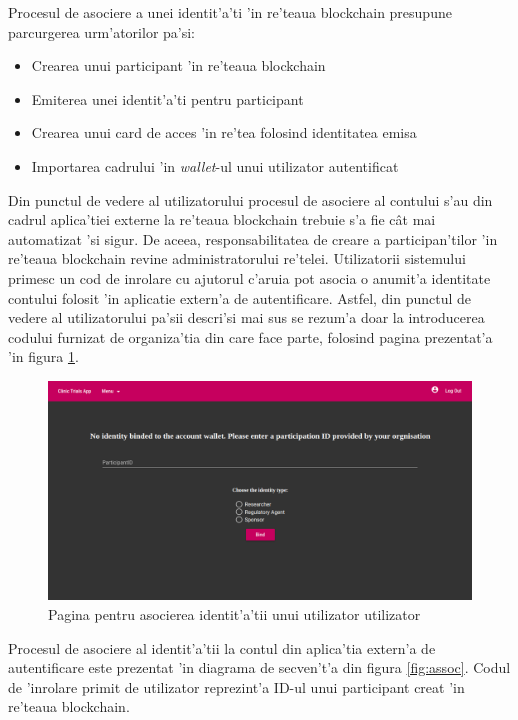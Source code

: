 \documentclass[12pt,a4paper,twoside]{report}
\begin{document}
    Procesul de asociere a unei identit'a'ti 'in re'teaua blockchain presupune parcurgerea urm'atorilor pa'si:
    \begin{itemize}
        \item Crearea unui participant 'in re'teaua blockchain
        \item Emiterea unei identit'a'ti pentru participant
        \item Crearea unui card de acces 'in re'tea folosind identitatea emisa
        \item Importarea cadrului 'in \emph{wallet}-ul unui utilizator autentificat
    \end{itemize}
    
    Din punctul de vedere al utilizatorului procesul de asociere al contului s'au din cadrul aplica'tiei externe la re'teaua blockchain trebuie s'a fie c\^at mai automatizat 'si sigur. De aceea, responsabilitatea de creare a participan'tilor 'in re'teaua blockchain revine administratorului re'telei. Utilizatorii sistemului primesc un cod de inrolare cu ajutorul c'aruia pot asocia o anumit'a identitate contului folosit 'in aplicatie extern'a de autentificare. Astfel, din punctul de vedere al utilizatorului pa'sii descri'si mai sus se rezum'a doar la introducerea codului furnizat de organiza'tia din care face parte, folosind pagina prezentat'a 'in figura \ref{fig:app-bind}.
    
     \begin{figure}[H]
		\begin{center}
			\includegraphics[scale=0.3]{img/bind.png}
			\caption{Pagina pentru asocierea identit'a'tii unui utilizator utilizator}
  			\label{fig:app-bind}
  		\end{center}
  		\end{figure}
  	
  	Procesul de asociere al identit'a'tii la contul din aplica'tia extern'a de autentificare este prezentat 'in diagrama de secven't'a din figura \ref{fig:assoc}. Codul de 'inrolare primit de utilizator reprezint'a ID-ul unui participant creat 'in re'teaua blockchain.
  	
\end{document}
